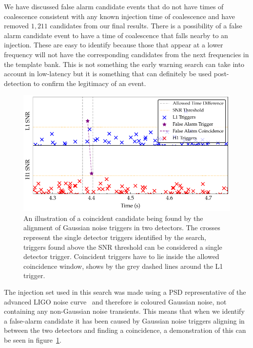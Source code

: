 We have discussed false alarm candidate events that do not have times of coalescence consistent with any known injection time of coalescence and have removed $1,211$ candidates from our final results. There is a possibility of a false alarm candidate event to have a time of coalescence that falls nearby to an injection. These are easy to identify because those that appear at a lower frequency will not have the corresponding candidates from the next frequencies in the template bank. This is not something the early warning search can take into account in low-latency but it is something that can definitely be used post-detection to confirm the legitimacy of an event.
%
\begin{figure}
       \centering
    \includegraphics[width=\textwidth]{images/6_earlywarning/identified-problems/low_sig_cands.pdf}
    \caption{An illustration of a coincident candidate being found by the alignment of Gaussian noise triggers in two detectors. The crosses represent the single detector triggers identified by the \gwadj search, triggers found above the SNR threshold can be considered a single detector trigger. Coincident triggers have to lie inside the allowed coincidence window, shows by the grey dashed lines around the L1 trigger.}
    \label{6:fig:low_significance_candidates}
\end{figure}
%
The injection set used in this search was made using a PSD representative of the advanced LIGO noise curve~\cite{aLIGO_design_curve:2018} and therefore is coloured Gaussian noise, not containing any non-Gaussian noise transients. This means that when we identify a false-alarm candidate it has been caused by Gaussian noise triggers aligning in between the two detectors and finding a coincidence, a demonstration of this can be seen in figure~\ref{6:fig:low_significance_candidates}.

